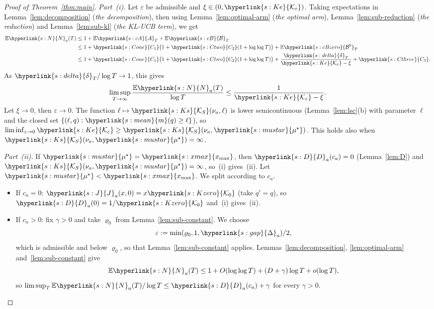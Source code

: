 \documentclass[11pt]{article}
\newcommand{\E}{\mathbb{E}}
\newcommand{\sy}[2]{{\hyperlink{#1}{#2}}}
\newcommand{\xmax}{\sy{s:xmax}{x_{\max}}}
\newcommand{\mean}{\sy{s:mean}{m}}
\newcommand{\Ks}{\sy{s:Ks}{\mathcal{K}_{S}}}
\newcommand{\mus}{\sy{s:mustar}{\mu^{\star}}}
\newcommand{\Nc}{\sy{s:N}{N}}
\newcommand{\Jf}{\sy{s:J}{J}}
\newcommand{\Dc}{\sy{s:D}{D}}
\newcommand{\Ko}{\sy{s:Kzero}{\mathcal{K}_{0}}}
\newcommand{\dl}{\sy{s:delta}{\delta}}
\newcommand{\gap}{\sy{s:gap}{\Delta}}
\newcommand{\cA}{\sy{s:cA}{\mathcal{A}}}
\newcommand{\cB}{\sy{s:cB}{\mathcal{B}}}
\newcommand{\cBz}{\sy{s:cBzero}{\mathcal{B}^{0}}}
\newcommand{\Ke}{\sy{s:Ke}{\mathcal{K}_{\varepsilon}}}
\newcommand{\Cone}{\sy{s:Cone}{C_{1}}}
\newcommand{\Ctwo}{\sy{s:Ctwo}{C_{2}}}
\newcommand{\Cthree}{\sy{s:Cthree}{C_{3}}}
\begin{document}
\begin{proof}[Proof of Theorem~\ref{thm:main}]
\emph{Part~(i).} Let $\varepsilon$ be admissible and $\xi\in(0,\Ke)$. Taking expectations in
Lemma~\ref{lem:decomposition} (\emph{the decomposition}), then using Lemma~\ref{lem:optimal-arm}
(\emph{the optimal arm}), Lemma~\ref{lem:sub-reduction} (\emph{the reduction}) and
Lemma~\ref{lem:sub-kl} (\emph{the KL-UCB term}), we get
\begin{align*}
\E \Nc_a(T)&\le1+\E\cA_T+\E\cB_T\\
&\le1+\Cone\big(1+\Ctwo(1+\log\log T)\big)+\E\cBz_T\\
&\le1+\Cone\big(1+\Ctwo(1+\log\log T)\big)+\frac{\dl_T}{\Ke-\xi}+\Cthree .
\end{align*}
As $\dl_T/\log T\to1$, this gives
\begin{equation*}
\limsup_{T\to\infty}\frac{\E \Nc_a(T)}{\log T}\le\frac{1}{\Ke-\xi}.
\end{equation*}
Let $\xi\to0$, then $\varepsilon\to0$. The function $\ell\mapsto\Ks(\nu_a,\ell)$ is lower
semicontinuous (Lemma~\ref{lem:lsc}(b) with parameter $\ell$ and the closed set
$\{(\ell,q):\mean(q)\ge\ell\}$), so $\liminf_{\varepsilon\to0}\Ke\ge\Ks(\nu_a,\mus)$. This holds
also when $\Ks(\nu_a,\mus)=\infty$.

\emph{Part~(ii).} If $\mus=\xmax$, then $\Dc_a(c_a)=0$ (Lemma~\ref{lem:D}) and
$\Ks(\nu_a,\mus)=\infty$, so~(i) gives~(ii). Let $\mus<\xmax$. We split according to
$c_a$.
\begin{itemize}
\item If $c_a=0$: $\Jf_a(x,0)=x\Ko$ (take $q'=q$), so $\Dc_a(0)=1/\Ko$ and~(i) gives~(ii).
\item If $c_a>0$: fix $\gamma>0$ and take $\varrho_0$ from Lemma~\ref{lem:sub-constant}. We choose
  \begin{equation*}
  \varepsilon:=\min(\varrho_0,1,\gap_a)/2,
  \end{equation*}
  which is admissible and below $\varrho_0$, so that Lemma~\ref{lem:sub-constant} applies.
  Lemmas~\ref{lem:decomposition}, \ref{lem:optimal-arm} and~\ref{lem:sub-constant} give
  \begin{equation*}
  \E \Nc_a(T)\le1+O(\log\log T)+(D+\gamma)\log T+o(\log T),
  \end{equation*}
  so $\limsup_T\E \Nc_a(T)/\log T\le \Dc_a(c_a)+\gamma$ for every $\gamma>0$.\qedhere
\end{itemize}
\end{proof}
\end{document}

